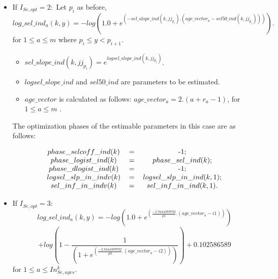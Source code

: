 \documentclass{article}
\begin{document}
\begin{itemize}
    
    \item If $I_{Se,opt}=2:$
    Let $p_i$ as before, 
\begin{equation}
            log\_sel\_ind_a(k,y) = - log( 1.0 + e^{(-sel\_slope\_ind(k,jj_{p_i}) . ( age\_vector_a - sel50\_ind(k,jj_{p_i})) )}).
        \end{equation}
        for $1\leq a \leq m
$ where $p_i\leq y < p_{i+1}$.
        \begin{itemize}
            \item $sel\_slope\_ind(k,jj_{p_i}) = e^{logsel\_slope\_ind(k,jj_{p_i})}$.
            \item $logsel\_slope\_ind$ and $sel50\_ind$ are parameters to be estimated.
            \item $age\_vector$ is calculated as follows: $age\_vector_a=2.(a+r_a-1)$, for $1\leq a \leq m$
            .
        \end{itemize}
The optimization phases of the estimable parameters in this case are as follows:
\begin{table}[H]
    \centering
    \begin{equation}
    \begin{tabular}{c c c}
        $phase\_selcoff\_ind(k)$ &= &-1;\\
        $phase\_logist\_ind(k)$& = &$phase\_sel\_ind(k)$;\\
        $phase\_dlogist\_ind(k)$ & =&-1;\\

        $logsel\_slp\_in\_indv(k)$ &= & $logsel\_slp\_in\_ind(k,1)$;\\
           $sel\_inf\_in\_indv(k)$& =   & $sel\_inf\_in\_ind(k,1).$
    \end{tabular}
    \end{equation}
    \label{tab: phase5}
\end{table}
    \item If $I_{Se,opt}=3:$
     \begin{equation}
        log\_sel\_ind_a(k,y)     =  -log(1.0 + e^{(\frac{-2.9444389792}{p1} . ( age\_vector_a - i1) )}) 
\end{equation}
    \begin{equation}
          +log\left(1 - \frac{1}{(1 + e^{(\frac{-2.9444389792}{p3} . ( age\_vector_a - i2))})}  \right)+0.102586589 
    \end{equation}
for $1\leq a \leq In_{Se,ages}^k.$ \\


\end{itemize}
\end{document}
